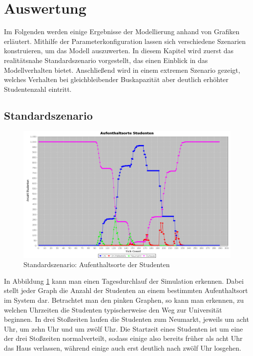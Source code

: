\documentclass[12pt,a4paper]{scrartcl}
\begin{document}
\section{Auswertung}\label{erg}
Im Folgenden werden einige Ergebnisse der Modellierung anhand von Grafiken erläutert. Mithilfe der Parameterkonfiguration lassen sich verschiedene Szenarien konstruieren, um das Modell auszuwerten. In diesem Kapitel wird zuerst das realitätsnahe Standardszenario vorgestellt, das einen Einblick in das Modellverhalten bietet. Anschließend wird in einem extremen Szenario gezeigt, welches Verhalten bei gleichbleibender Buskapazität aber deutlich erhöhter Studentenzahl eintritt.


\subsection{Standardszenario}\label{s1}
\begin{figure}
\includegraphics[scale=0.4]{Standardszenario_Aufenthaltsorte.png}
\caption{Standardszenario: Aufenthaltsorte der Studenten}
\label{s1g1}
\end{figure}

In Abbildung \ref{s1g1} kann man einen Tagesdurchlauf der Simulation erkennen. Dabei stellt jeder Graph die Anzahl der Studenten an einem bestimmten Aufenthaltsort im System dar. Betrachtet man den pinken Graphen, so kann man erkennen, zu welchen Uhrzeiten die Studenten typischerweise den Weg zur Universität beginnen. In drei Stoßzeiten laufen die Studenten zum Neumarkt, jeweils um acht Uhr, um zehn Uhr und um zwölf Uhr. Die Startzeit eines Studenten ist um eine der drei Stoßzeiten normalverteilt, sodass einige also bereits früher als acht Uhr das Haus verlassen, während einige auch erst deutlich nach zwölf Uhr losgehen. 
\end{document}
